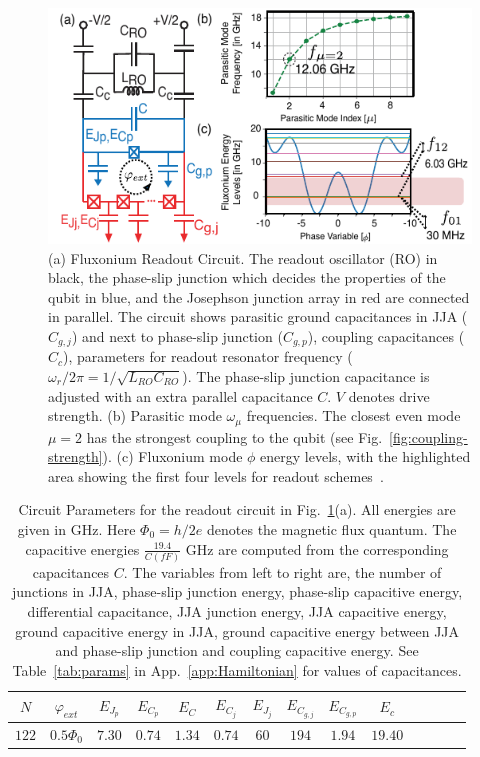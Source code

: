 \documentclass[%
reprint,
superscriptaddress,
 amsmath,amssymb,
 aps,
 prx,
longbibliography,
floatfix,
]{revtex4-2}
\begin{document}
\begin{figure}[htb]
\centering    
\includegraphics[width=\linewidth]{Figures/Meas_Circuit.pdf}
\caption{(a) Fluxonium Readout Circuit. The readout oscillator (RO) in black, the phase-slip junction which decides the properties of the qubit in blue, and the Josephson junction array in red are connected in parallel. The circuit shows parasitic ground capacitances in JJA ($C_{g,j}$) and next to phase-slip junction ($C_{g,p}$), coupling capacitances ($C_c$), parameters for readout resonator frequency ($\omega_r/2\pi=1/\sqrt{L_{RO}C_{RO}}$). The phase-slip junction capacitance is adjusted with an extra parallel capacitance $C$. $V$ denotes drive strength. (b) Parasitic mode $\omega_\mu$ frequencies. The closest even mode $\mu = 2$ has the strongest coupling to the qubit (see Fig.~\ref{fig:coupling-strength}). (c) Fluxonium mode $\phi$ energy levels, with the highlighted area showing the first four levels for readout schemes~\cite{zhang_universal_2021}. 
}
\label{fig:meas_circuit}
\end{figure}
\begin{table}[h]
\centering
\begin{tabular}{|c|c|c|c|c|c|c|c|c|c|c|c|c|c|}
    \hline
     $N$&$\varphi_{ext}$ & $E_{J_p}$ & $E_{C_p}$&$E_C$&$E_{C_j}$& $E_{J_j}$& $E_{C_{g,j}}$&$E_{C_{g,p}}$&$E_c$\\
     \hline
$122$&$0.5\Phi_0$& $7.30$ & $0.74$ &$1.34$&$0.74$ & $60$ & $194$ &$1.94$ &$19.40$\\   \hline
\end{tabular}
\caption{Circuit Parameters for the readout circuit in Fig.~\ref{fig:meas_circuit}(a). All energies are given in GHz. Here $\Phi_0=h/2e$ denotes the magnetic flux quantum. The capacitive energies $\frac{19.4}{C(fF)}$ GHz are computed from the corresponding capacitances $C$. The variables from left to right are, the number of junctions in JJA, phase-slip junction energy, phase-slip capacitive energy, differential capacitance, JJA junction energy, JJA capacitive energy, ground capacitive energy in JJA, ground capacitive energy between JJA and phase-slip junction and coupling capacitive energy. See Table~\ref{tab:params} in App.~\ref{app:Hamiltonian} for values of capacitances.}
\label{tab:circuit_params}
\end{table}
\end{document}
